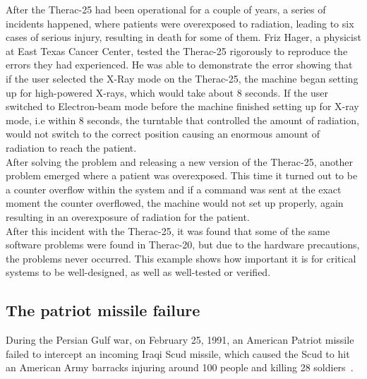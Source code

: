 After the Therac-25 had been operational for a couple of years, a series of incidents happened, where patients were overexposed to radiation, leading to six cases of serious injury, resulting in death for some of them. Friz Hager, a physicist at East Texas Cancer Center, tested the Therac-25 rigorously to reproduce the errors they had experienced. He was able to demonstrate the error showing that if the user selected the X-Ray mode on the Therac-25, the machine began setting up for high-powered X-rays, which would take about 8 seconds. If the user switched to Electron-beam mode before the machine finished setting up for X-ray mode, i.e within 8 seconds, the turntable that controlled the amount of radiation, would not switch to the correct position causing an enormous amount of radiation to reach the patient.\\
After solving the problem and releasing a new version of the Therac-25, another problem emerged where a patient was overexposed. This time it turned out to be a counter overflow within the system and if a command was sent at the exact moment the counter overflowed, the machine would not set up properly, again resulting in an overexposure of radiation for the patient. \\
After this incident with the Therac-25, it was found that some of the same software problems were found in Therac-20, but due to the hardware precautions, the problems never occurred.
This example shows how important it is for critical systems to be well-designed, as well as well-tested or verified.

\subsection{The patriot missile failure}
During the Persian Gulf war, on February 25, 1991, an American Patriot missile failed to intercept an incoming Iraqi Scud missile, which caused the Scud to hit an American Army barracks injuring around 100 people and killing 28 soldiers~\cite{patriot1991}.\\

